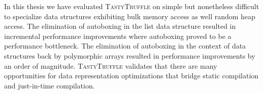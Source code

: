 In this thesis we have evaluated \textsc{TastyTruffle} on simple but nonetheless difficult to specialize data structures exhibiting bulk memory access as well random heap access.
The elimination of autoboxing in the list data structure resulted in incremental performance improvements where autoboxing proved to be a performance bottleneck.
The elimination of autoboxing in the context of data structures back by polymorphic arrays resulted in performance improvements by an order of magnitude.
\textsc{TastyTruffle} validates that there are many opportunities for data representation optimizations that bridge static compilation and just-in-time compilation.
